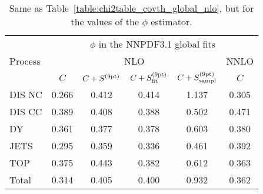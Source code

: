 \begin{table}[t]
\begin{center}
\renewcommand*{\arraystretch}{1.78}
\footnotesize
\begin{tabular}{|l|c|c|cc|c|}
  \toprule
  & \multicolumn{5}{c|}{$\phi$ in the NNPDF3.1 global fits}   \\
 Process & \multicolumn{4}{c|}{NLO}  & NNLO  \\
 & $C$ & $C+S^{(\rm 9pt)}$   &  $C+S^{(\rm 9pt)}_{\rm fit}$ &
  $C+S^{(\rm 9pt)}_{\rm sampl}$   &  $C$ \\
  \toprule
  DIS NC     & 0.266 & 0.412 &  0.414 & 1.137 & 0.305 \\
  DIS CC     & 0.389 & 0.408 &  0.388 & 0.502 & 0.471 \\
  \midrule
  DY         & 0.361 & 0.377 &  0.378 & 0.603 & 0.380 \\
  JETS       & 0.295 & 0.359 &  0.336 & 0.461 & 0.392 \\
  TOP        & 0.375 & 0.443 &  0.382 & 0.612 & 0.363 \\
  \midrule
  Total      & 0.314 & 0.405 &  0.400 & 0.932 & 0.362 \\
  \bottomrule
\end{tabular}
\end{center}
\caption{Same as Table~\ref{table:chi2table_covth_global_nlo}, but 
  for the values of the $\phi$ estimator.
  \label{table:phitable_covth_global_nlo}}
  \end{table}
